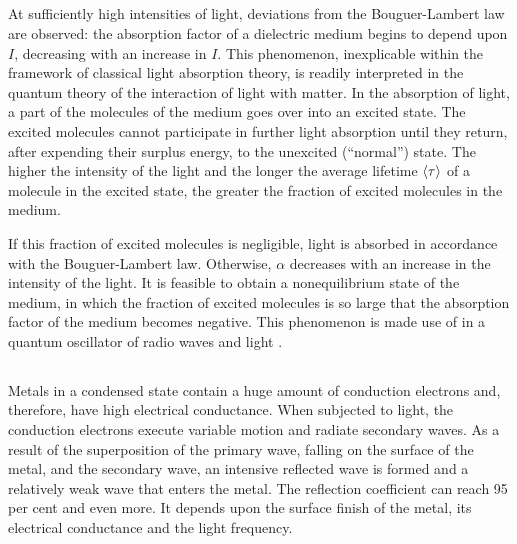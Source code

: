 \subsection{}\label{34.2.4} At sufficiently high intensities of light, deviations from the Bouguer-Lambert law  are observed: the absorption factor of a dielectric medium begins to depend upon $I$, decreasing with an increase in $I$. This phenomenon, inexplicable within the framework of classical light absorption theory, is readily interpreted in the quantum theory of the interaction of light with matter. In the absorption of light, a part of the molecules of the medium goes over into an excited state. The excited molecules
cannot participate in further light absorption until they
return, after expending their surplus energy, to the unexcited
(``normal'') state. The higher the intensity of the light and the longer the average lifetime $\expval{\tau}$ of a molecule in the excited state, the greater the fraction of excited molecules in the medium. 

If this fraction of excited molecules is negligible, light is absorbed in accordance with the Bouguer-Lambert law. Otherwise, $\alpha$ decreases with an increase in the intensity of the light. It is feasible to obtain a nonequilibrium state of the medium, in which the fraction of excited molecules is so large that the absorption factor of the medium becomes negative. This phenomenon is made use of in a quantum oscillator of radio waves and light .

\subsection{}\label{34.2.5} Metals in a condensed state contain a huge amount of conduction electrons and, therefore, have high electrical conductance. When subjected to light, the conduction electrons execute variable motion and radiate secondary waves. As a result of the superposition of the primary wave, falling on the surface of the metal, and the secondary wave, an intensive reflected wave is formed and a relatively weak wave that enters the metal. The reflection coefficient  can reach 95 per cent and even more. It depends upon the surface finish of the metal, its electrical conductance and the light frequency. 

